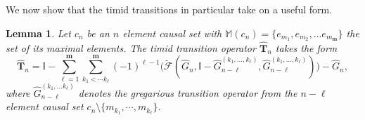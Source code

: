 \documentclass[11pt]{article}
\newtheorem{lemma}[theorem]{Lemma}
\newcommand{\hG}{\hat G}
\newcommand{\hTi}{\widehat{\mathbf{T}}}
\newcommand{\mm}{\mathbb{M}}
\newcommand{\bmm}{{\mathbf m}}
\newcommand{\id}{\mathbb I}
\begin{document}
We now show that the  timid transitions in particular take on a
useful form. 
\begin{lemma}\label{GTA.lemma}
Let $c_n$ be an $n$ element causal set with $\mm(c_n)=\{e_{m_1}, e_{m_2}
,\ldots e_{m_\bmm}\}$ the set
of its maximal elements.  The timid transition
operator $\hTi_n$ takes the form 
\begin{equation}
\hTi_n=\id-\sum_{\ell =1}^\bmm \sum_{k_1<\cdots k_\ell}^\bmm
(-1)^{\ell
  -1} \biggl( \tilde{\mathcal{F}}(\hG_n,\mathbb{I}-\hG_{n-\ell}^{(k_1,
  \ldots, 
    k_\ell )}  ,\hG_{n-\ell}^{(k_1, \ldots, k_\ell )})\biggr)  - \hG_n
, \label{timidop.eq} 
\end{equation}
where $\hG_{n-\ell}^{(k_1, \ldots k_\ell
  )}$ denotes the gregarious transition operator from the $n-\ell$ element
causal set  $c_n\setminus \lbrace m_{k_1},\cdots ,m_{k_\ell}\rbrace$. 
\end{lemma}
\end{document}
